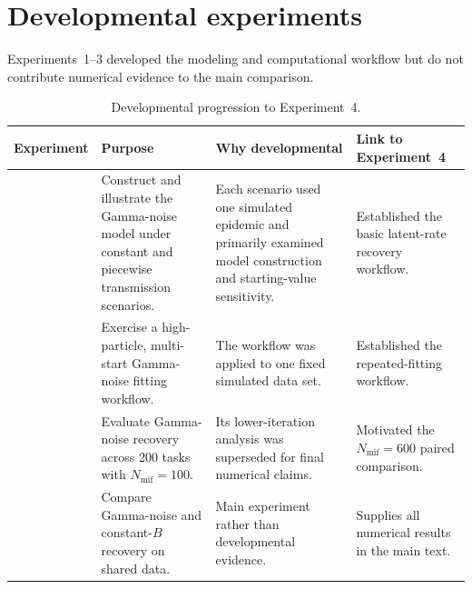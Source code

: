 \section{Developmental experiments}
\label{app:developmental}

Experiments~1--3 developed the modeling and computational workflow but do not
contribute numerical evidence to the main comparison.

\begin{table}[htbp]
\centering
\small
\caption{Developmental progression to Experiment~4.}
\begin{tabularx}{\textwidth}{
  >{\raggedright\arraybackslash}p{}
  >{\raggedright\arraybackslash}p{}
  >{\raggedright\arraybackslash}p{}
  >{\raggedright\arraybackslash}X}
\toprule
Experiment & Purpose & Why developmental & Link to Experiment~4 \\
\midrule
1
& Construct and illustrate the Gamma-noise model under constant and
piecewise transmission scenarios.
& Each scenario used one simulated epidemic and primarily examined model
construction and starting-value sensitivity.
& Established the basic latent-rate recovery workflow. \\
2
& Exercise a high-particle, multi-start Gamma-noise fitting workflow.
& The workflow was applied to one fixed simulated data set.
& Established the repeated-fitting workflow. \\
3
& Evaluate Gamma-noise recovery across 200 tasks with
\(N_{\mathrm{mif}}=100\).
& Its lower-iteration analysis was superseded for final numerical claims.
& Motivated the \(N_{\mathrm{mif}}=600\) paired comparison. \\
4
& Compare Gamma-noise and constant-\(B\) recovery on shared data.
& Main experiment rather than developmental evidence.
& Supplies all numerical results in the main text. \\
\bottomrule
\end{tabularx}
\end{table}
